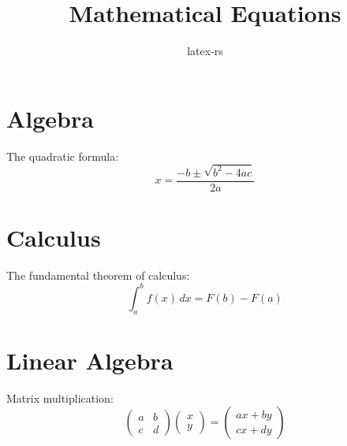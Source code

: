 \documentclass{article}
\title{Mathematical Equations}
\author{latex-rs}
\begin{document}
\maketitle

\section{Algebra}

The quadratic formula:
\begin{equation}
    x = \frac{-b \pm \sqrt{b^2 - 4ac}}{2a}
\end{equation}

\section{Calculus}

The fundamental theorem of calculus:
\begin{equation}
    \int_a^b f(x)\,dx = F(b) - F(a)
\end{equation}

\section{Linear Algebra}

Matrix multiplication:
\begin{equation}
    \begin{pmatrix}
        a & b \\
        c & d
    \end{pmatrix}
    \begin{pmatrix}
        x \\
        y
    \end{pmatrix}
    =
    \begin{pmatrix}
        ax + by \\
        cx + dy
    \end{pmatrix}
\end{equation}
\end{document}
